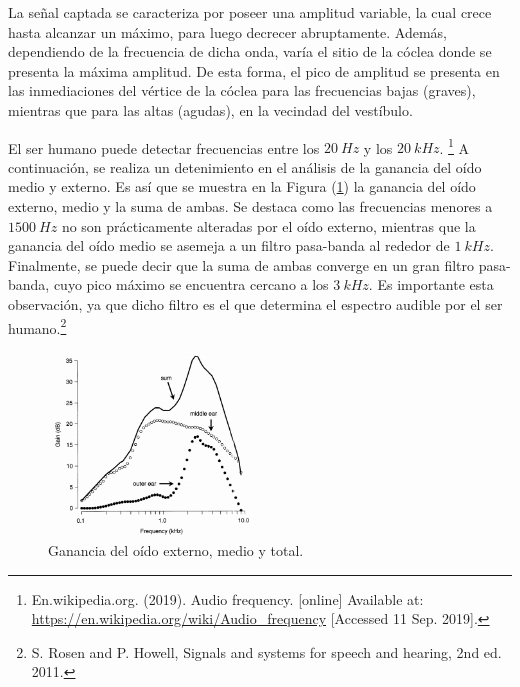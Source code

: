 La señal captada se caracteriza por poseer una amplitud variable, la cual crece hasta alcanzar un máximo, para luego decrecer abruptamente. Además, dependiendo de la frecuencia de dicha onda, varía el sitio de la cóclea donde se presenta la máxima amplitud. De esta forma, el pico de amplitud se presenta en las inmediaciones del vértice de la cóclea para las frecuencias bajas (graves), mientras que para las altas (agudas), en la vecindad del vestíbulo.

El ser humano puede detectar frecuencias entre los $20 \ Hz$ y los $20 \ kHz$. \footnote{En.wikipedia.org. (2019). Audio frequency. [online] Available at: \url{https://en.wikipedia.org/wiki/Audio_frequency} [Accessed 11 Sep. 2019].} A continuación, se realiza un detenimiento en el análisis de la ganancia del oído medio y externo. Es así que se muestra en la Figura (\ref{fig:oidoganancia}) la ganancia del oído externo, medio y la suma de ambas. Se destaca como las frecuencias menores a $1500 \ Hz$ no son prácticamente alteradas por el oído externo, mientras que la ganancia del oído medio se asemeja a un filtro pasa-banda al rededor de $1 \ kHz$. Finalmente, se puede decir que la suma de ambas converge en un gran filtro pasa-banda, cuyo pico máximo se encuentra cercano a los $3 \ kHz$. Es importante esta observación, ya que dicho filtro es el que determina el espectro audible por el ser humano.\footnote{S. Rosen and P. Howell, Signals and systems for speech and hearing, 2nd ed. 2011.}
\begin{figure}[H]
\centering
	\includegraphics[width=0.5\textwidth]{Imagenes/Ganancia-del-oido-externo-y-medio.png}
	\caption{Ganancia del oído externo, medio y total.}
	\label{fig:oidoganancia}
\end{figure}

